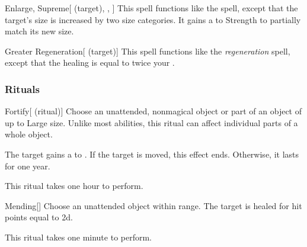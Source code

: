 \lowercase{\hypertarget{spell:Enlarge, Supreme}{}}\label{spell:Enlarge, Supreme}
\begin{attuneability}[\nth{7}]{\hypertarget{spell:Enlarge, Supreme}{Enlarge, Supreme}}[ (target), , ]
This spell functions like the  spell, except that the target's size is increased by two size categories.
It gains a   to Strength to partially match its new size.
\end{attuneability}
\vspace{0.25em}



\lowercase{\hypertarget{spell:Greater Regeneration}{}}\label{spell:Greater Regeneration}
\begin{attuneability}[\nth{7}]{\hypertarget{spell:Greater Regeneration}{Greater Regeneration}}[ (target)]
This spell functions like the \textit{regeneration} spell, except that the healing is equal to twice your .
\end{attuneability}
\vspace{0.25em}



\subsubsection{Rituals}


\lowercase{\hypertarget{spell:Fortify}{}}\label{spell:Fortify}
\begin{attuneability}[\nth{1}]{\hypertarget{spell:Fortify}{Fortify}}[ (ritual)]
Choose an unattended, nonmagical object or part of an object of up to Large size.
Unlike most abilities, this ritual can affect individual parts of a whole object.

The target gains a   to .
If the target is moved, this effect ends.
Otherwise, it lasts for one year.

This ritual takes one hour to perform.
\end{attuneability}
\vspace{0.25em}



\lowercase{\hypertarget{spell:Mending}{}}\label{spell:Mending}
\begin{freeability}[\nth{1}]{\hypertarget{spell:Mending}{Mending}}[]
Choose an unattended object within \rngclose range.
The target is healed for hit points equal to  \plus2d.

This ritual takes one minute to perform.
\end{freeability}
\vspace{0.25em}



